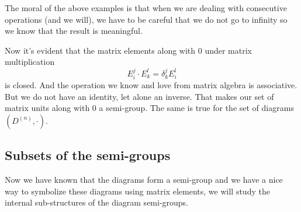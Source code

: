 \documentclass[10pt,a4paper]{article}
\begin{document}
	The moral of the above examples is that when we are dealing with consecutive operations (and we will), we have to be careful that we do not go to infinity so we know that the result is meaningful.	
		
	Now it's evident that the matrix elements along with $0$ under matrix multiplication
	\begin{equation}
	E_i^j \cdot E_k^l = \delta^j_k E_i^l
	\end{equation}
	is closed. And the operation we know and love from matrix algebra is associative. But we do not have an identity, let alone an inverse. That makes our set of matrix units along with $0$ a semi-group. The same is true for the set of diagrams $(D^{(n)},\cdot )$.
	
	\subsection{Subsets of the semi-groups}
	Now we have known that the diagrams form a semi-group and we have a nice way to symbolize these diagrams using matrix elements, we will study the internal sub-structures of the diagram semi-groups. 
	
\end{document}
